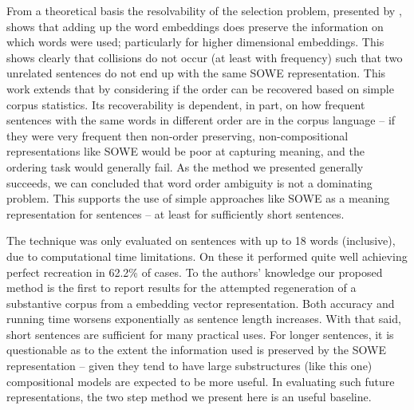 \documentclass[11pt]{article}
\theoremstyle{plain}
\theoremstyle{definition}
\newcommand{\textcite}{\protect\newcite}
\begin{document}
From a theoretical basis the resolvability of the selection problem, presented by \textcite{White2015BOWgen}, shows that adding up the word embeddings does preserve the information on which words were used; particularly for higher dimensional embeddings. This shows clearly that collisions do not occur (at least with frequency) such that two unrelated sentences do not end up with the same SOWE representation. 
This work extends that by considering if the order can be recovered based on simple corpus statistics. Its recoverability is dependent, in part, on how frequent sentences with the same words in different order are in the corpus language -- if they were very frequent then non-order preserving, non-compositional representations like SOWE would be poor at capturing meaning, and the ordering task would generally fail. As the method we presented generally succeeds, we can concluded that word order ambiguity is not a dominating problem. This supports the use of simple approaches like SOWE as a meaning representation for sentences -- at least for sufficiently short sentences.

The technique was only evaluated on sentences with up to 18 words (inclusive), due to computational time limitations. On these it performed quite well achieving perfect recreation in 62.2\% of cases. To the authors' knowledge our proposed method is the first to report results for the attempted regeneration of a substantive corpus from a embedding vector representation. Both accuracy and running time worsens exponentially as sentence length increases. With that said, short sentences are sufficient for many practical uses. For longer sentences, it is questionable as to the extent the information used is preserved by the SOWE representation -- given they tend to have large substructures (like this one) compositional models are expected to be more useful. In evaluating such future representations, the two step method we present here is an useful baseline.


\end{document}

